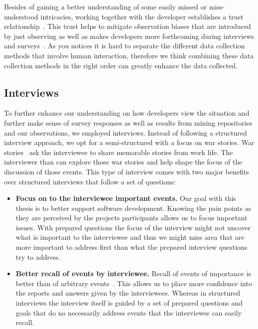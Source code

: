 Besides of gaining a better understanding of some easily missed or miss-understood intricacies, working together with the developer establishes a trust relationship~\cite{letherbridge:ese2005}.
This trust helps to mitigate observation biases that are introduced by just observing as well as makes developers more forthcoming during interviews and surveys~\cite{letherbridge:ese2005}.
As you notices it is hard to separate the different data collection methods that involve human interaction, therefore we think combining these data collection methods in the right order can greatly enhance the data collected.


\subsection{Interviews}
To further enhance our understanding on how developers view the situation and further make sense of survey responses as well as results from mining repositories and our observations, we employed interviews.
Instead of following a structured interview approach, we opt for a semi-structured with a focus on war stories.
War stories~\cite{lutters:ist:2007} ask the interviewee to share memorable stories from work life.
The interviewer than can explore those war stories and help shape the focus of the discussion of those events.
This type of interview comes with two major benefits over structured interviews that follow a set of questions:

\begin{itemize}
\item\textbf{Focus on to the interviewee important events.}
Our goal with this thesis is to better support software development.
Knowing the pain points as they are perceived by the projects participants allows us to focus important issues.
With prepared questions the focus of the interview might not uncover what is important to the interviewee and thus we might miss area that are more important to address first than what the prepared interview questions try to address.
\item\textbf{Better recall of events by interviewee.}
Recall of events of importance is better than of arbitrary events~\cite{lutters:ist:2007}.
This allows us to place more confidence into the reports and answers given by the interviewees.
Whereas in structured interviews the interview itself is guided by a set of prepared questions and goals that do no necessarily address events that the interviewee can easily recall.
\end{itemize}

